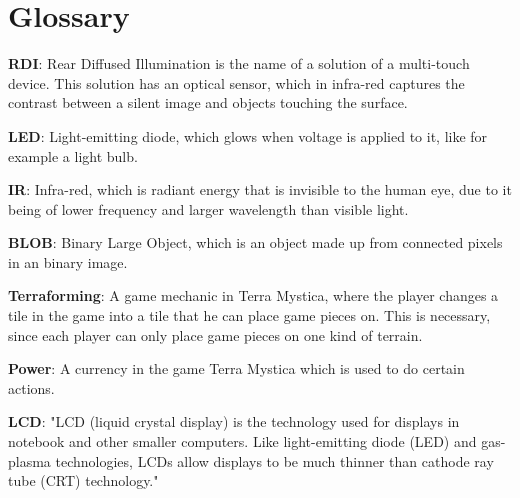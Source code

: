 \chapter*{Glossary}\label{gloss}

\textbf{RDI}: Rear Diffused Illumination is the name of a solution of a multi-touch device\citep{multiTT}. This solution has an optical sensor, which in infra-red captures the contrast between a silent image and objects touching the surface.

\textbf{LED}: Light-emitting diode, which glows when voltage is applied to it, like for example a light bulb.

\textbf{IR}: Infra-red, which is radiant energy that is invisible to the human eye, due to it being of lower frequency and larger wavelength than visible light.

\textbf{BLOB}: Binary Large Object, which is an object made up from connected pixels in an binary image. 

\textbf{Terraforming}: A game mechanic in Terra Mystica, where the player changes a tile in the game into a tile that he can place game pieces on. This is necessary, since each player can only place game pieces on one kind of terrain.

\textbf{Power}: A currency in the game Terra Mystica which is used to do certain actions.

\textbf{LCD}: "LCD (liquid crystal display) is the technology used for displays in notebook and other smaller computers. Like light-emitting diode (LED) and gas-plasma technologies, LCDs allow displays to be much thinner than cathode ray tube (CRT) technology." 